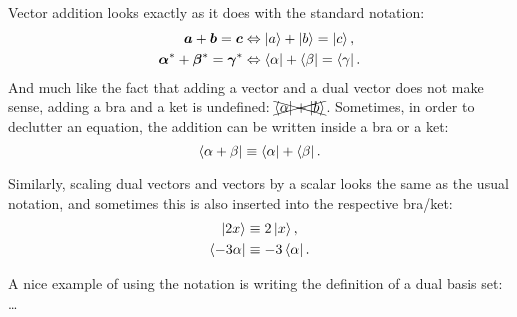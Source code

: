 Vector addition looks exactly as it does with the standard notation:
\begin{equation}
    \begin{aligned}
        \bm{a}+\bm{b}=\bm{c} &\Leftrightarrow \ket{a}+\ket{b}=\ket{c},\\
        \bm{\alpha}^{*}+\bm{\beta}^{*}=\bm{\gamma}^{*} &\Leftrightarrow \bra{\alpha}+\bra{\beta}=\bra{\gamma}.
    \end{aligned}
    \label{eq:braket_addition}
\end{equation}
And much like the fact that adding a vector and a dual vector does not make sense, adding a bra and a ket is undefined: $\xcancel{\bra{\alpha}+\ket{b}}$. Sometimes, in order to declutter an equation, the addition can be written inside a bra or a ket:
\begin{equation}
    \bra{\alpha+\beta} \equiv \bra{\alpha}+\bra{\beta}.
    \label{eq:braket_addition_inside_notation}
\end{equation}

Similarly, scaling dual vectors and vectors by a scalar looks the same as the usual notation, and sometimes this is also inserted into the respective bra/ket:
\begin{equation}
    \begin{aligned}
        \ket{2x} &\equiv 2\ket{x},\\
        \bra{-3\alpha} &\equiv -3\bra{\alpha}.
    \end{aligned}
    \label{eq:braket_scaling}
\end{equation}

A nice example of using the notation is writing the definition of a dual basis set: \ldots

%

